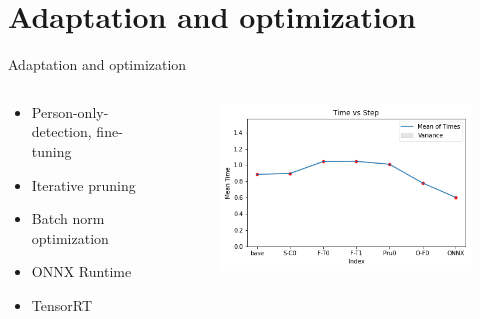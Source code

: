 \documentclass[en]{sdqbeamer}
\begin{document}
\section{Adaptation and optimization}
\begin{frame}{Adaptation and optimization}
  \begin{columns}
    \begin{column}{0.4\textwidth}
      \begin{itemize}
        \item Person-only-detection, fine-tuning
        \item Iterative pruning
        \item Batch norm optimization
        \item ONNX Runtime
        \item TensorRT
      \end{itemize}
    \end{column}
    \begin{column}{0.6\textwidth}
      \begin{figure}
        \includegraphics[scale=0.5]{time_against_step}
      \end{figure}
    \end{column}
  \end{columns}
\end{frame}
\end{document}
